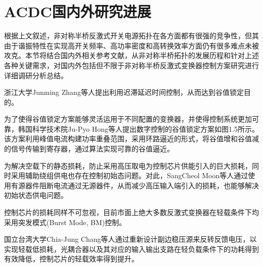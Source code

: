 


\section{ACDC国内外研究进展}

根据上文叙述，非对称半桥反激式开关电源拓扑在各方面都有很强的竞争性，但其由于谐振特性在实现高开关频率、高功率密度和高转换效率方面仍有很多难点未被攻克。本节将结合国内外相关参考文献，从非对称半桥拓扑的发展历程和针对上述各种关键需求，对国内外包括但不限于非对称半桥反激式变换器控制方案研究进行详细调研分析总结。

浙江大学Junming Zhang等人提出利用迟滞延迟时间控制\cite{zhang2011_vallye_switch1}，从而达到谷值锁定目的。

为了使得谷值锁定方案能够灵活运用于不同配置的变换器，并使得控制系统更加可靠，韩国科学技术院Ju-Pyo Hong等人提出数字控制的谷值锁定方案如图1.5所示\cite{hong2014_vallye_switch2}。该方案利用峰值电流构建功率重叠范围，采用环路逼近的形式，将谷值增和谷值减的信号传输到寄存器，通过算法实现可靠的谷值逼近。

为解决空载下的静态损耗，防止采用高压取电为控制芯片供能引入的巨大损耗，同时采用辅助绕组供电也存在控制初始态问题。对此，SangCheol Moon等人通过使用有源器件阻断电流通过无源器件，从而减少高压输入端引入的损耗，也能够解决初始状态供电问题\cite{moon2011new_static_loss1}。

控制芯片的损耗同样不可忽视，目前市面上绝大多数反激式变换器在轻载条件下均采用突发模式(Burst Mode, BM)控制\cite{choi2005_BM1,lo2008_BM2}。

国立台湾大学Chia-Jung Chang等人通过重新设计副边稳压源来反转反馈电压，以实现轻载低损耗\cite{chang2012_static_loss2}，光耦合器以及其对应的输入输出支路在轻负载条件下的功耗得到有效降低，控制芯片的轻载效率得到提升。


